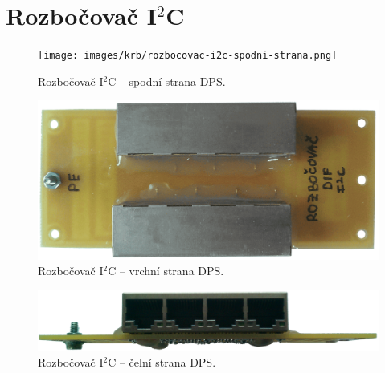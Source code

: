 \section{Rozbočovač I$^2$C}
\label{app:rozbocovac-i2c}
\begin{figure}[H]
    \centering
    \texttt{[image: images/krb/rozbocovac-i2c-spodni-strana.png]}
    \caption{Rozbočovač I$^2$C – spodní strana DPS.}
    \label{fig:rozbocovac-i2c-spodni-strana}
\end{figure}

\begin{figure}[H]
    \centering
    \includegraphics[width=\textwidth]{images/krb/rozbocovac-i2c-vrchni-strana.png}
    \caption{Rozbočovač I$^2$C – vrchní strana DPS.}
    \label{fig:rozbocovac-i2c-vrchni-strana}
\end{figure}

\begin{figure}[H]
    \centering
    \includegraphics[width=\textwidth]{images/krb/rozbocovac-i2c-celni-strana.png}
    \caption{Rozbočovač I$^2$C – čelní strana DPS.}
    \label{fig:rozbocovac-i2c-celni-strana}
\end{figure}